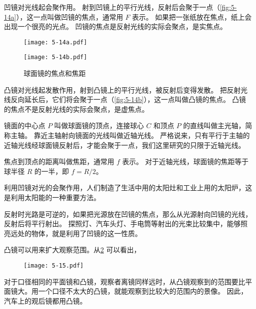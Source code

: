 凹镜对光线起会聚作用。
射到凹镜上的平行光线，反射后会聚于一点（\cref{fig:5-14a}），这一点叫做凹镜的焦点，通常用 $F$ 表示。
如果把一张纸放在焦点，纸上会出现一个很亮的光点。
凹镜的焦点是反射光线的实际会聚点，是实焦点。
\begin{figure}
  \begin{minipage}[b]{0.48\linewidth}\centering
    \texttt{[image: 5-14a.pdf]}
    \subcaption{}\label{fig:5-14a}
  \end{minipage}
  \begin{minipage}[b]{0.48\linewidth}\centering
    \texttt{[image: 5-14b.pdf]}
    \subcaption{}\label{fig:5-14b}
  \end{minipage}
  \caption{球面镜的焦点和焦距}\label{fig:5-14}
\end{figure}

凸镜对光线起发散作用，射到凸镜上的平行光线，被反射后变得发散。
把反射光线反向延长后，它们将会聚于一点（\cref{fig:5-14b}），这一点叫做凸镜的焦点。
凸镜的焦点不是反射光线的实际会聚点，是虚焦点。

镜面的中心点 $P$ 叫做球面镜的顶点，连接球心 $C$ 和顶点 $P$ 的直线叫做主光轴，简称主轴。
靠近主轴射向镜面的光线叫做近轴光线。
严格说来，只有平行于主轴的近轴光线经球面镜反射后，才能会聚于一点，我们这里研究的只限于近轴光线。

焦点到顶点的距离叫做焦距，通常用 $f$ 表示。
对于近轴光线，球面镜的焦距等于球半径 $R$ 的一半，即 $f=R/2$。

利用凹镜对光的会聚作用，人们制造了生活中用的太阳灶和工业上用的太阳炉，这是利用太阳能的一种重要方法。

反射时光路是可逆的，如果把光源放在凹镜的焦点，那么从光源射向凹镜的光线，反射后将平行射出。
探照灯、汽车头灯、手电筒等射出的光束比较集中，能够照亮远处的物体，就是利用了凹镜的这一性质。

凸镜可以用来扩大观察范围。从\cref{fig:5-15} 可以看出，
\begin{figure}
  \texttt{[image: 5-15.pdf]}
  \caption{}\label{fig:5-15}
\end{figure}
对于口径相同的平面镜和凸镜，观察者离镜同样远时，从凸镜观察到的范围要比平面镜大。用一个口径不太大的凸镜，就能观察到比较大的范围内的景像。
因此，汽车上的观后镜都用凸镜。

